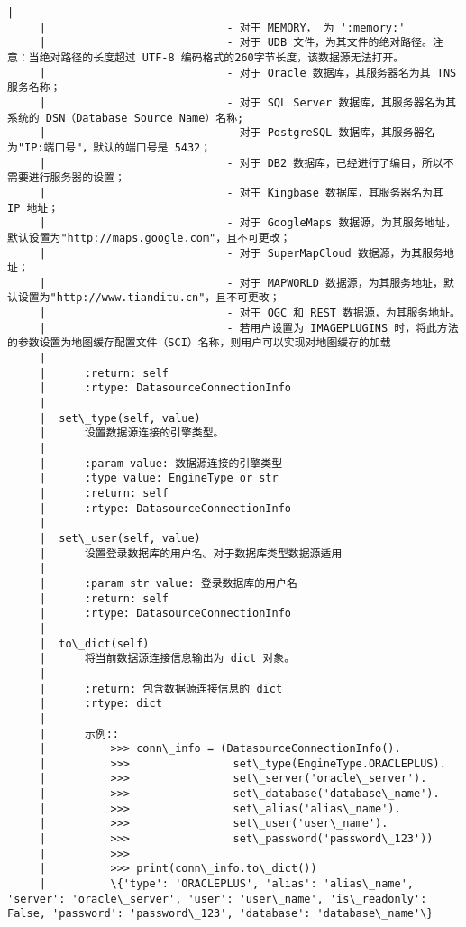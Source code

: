 \documentclass[11pt]{article}
\begin{document}
\begin{Verbatim}[commandchars=\\\{\}]
     |      
     |                            - 对于 MEMORY， 为 ':memory:'
     |                            - 对于 UDB 文件，为其文件的绝对路径。注意：当绝对路径的长度超过 UTF-8 编码格式的260字节长度，该数据源无法打开。
     |                            - 对于 Oracle 数据库，其服务器名为其 TNS 服务名称；
     |                            - 对于 SQL Server 数据库，其服务器名为其系统的 DSN（Database Source Name）名称;
     |                            - 对于 PostgreSQL 数据库，其服务器名为"IP:端口号"，默认的端口号是 5432；
     |                            - 对于 DB2 数据库，已经进行了编目，所以不需要进行服务器的设置；
     |                            - 对于 Kingbase 数据库，其服务器名为其 IP 地址；
     |                            - 对于 GoogleMaps 数据源，为其服务地址，默认设置为"http://maps.google.com"，且不可更改；
     |                            - 对于 SuperMapCloud 数据源，为其服务地址；
     |                            - 对于 MAPWORLD 数据源，为其服务地址，默认设置为"http://www.tianditu.cn"，且不可更改；
     |                            - 对于 OGC 和 REST 数据源，为其服务地址。
     |                            - 若用户设置为 IMAGEPLUGINS 时，将此方法的参数设置为地图缓存配置文件（SCI）名称，则用户可以实现对地图缓存的加载
     |      
     |      :return: self
     |      :rtype: DatasourceConnectionInfo
     |  
     |  set\_type(self, value)
     |      设置数据源连接的引擎类型。
     |      
     |      :param value: 数据源连接的引擎类型
     |      :type value: EngineType or str
     |      :return: self
     |      :rtype: DatasourceConnectionInfo
     |  
     |  set\_user(self, value)
     |      设置登录数据库的用户名。对于数据库类型数据源适用
     |      
     |      :param str value: 登录数据库的用户名
     |      :return: self
     |      :rtype: DatasourceConnectionInfo
     |  
     |  to\_dict(self)
     |      将当前数据源连接信息输出为 dict 对象。
     |      
     |      :return: 包含数据源连接信息的 dict
     |      :rtype: dict
     |      
     |      示例::
     |          >>> conn\_info = (DatasourceConnectionInfo().
     |          >>>                set\_type(EngineType.ORACLEPLUS).
     |          >>>                set\_server('oracle\_server').
     |          >>>                set\_database('database\_name').
     |          >>>                set\_alias('alias\_name').
     |          >>>                set\_user('user\_name').
     |          >>>                set\_password('password\_123'))
     |          >>>
     |          >>> print(conn\_info.to\_dict())
     |          \{'type': 'ORACLEPLUS', 'alias': 'alias\_name', 'server': 'oracle\_server', 'user': 'user\_name', 'is\_readonly': False, 'password': 'password\_123', 'database': 'database\_name'\}

\end{Verbatim}
\end{document}
